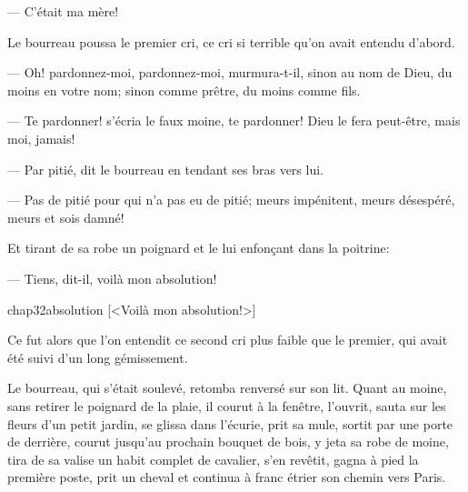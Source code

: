 — C'était ma mère!

Le bourreau poussa le premier cri, ce cri si terrible qu'on avait entendu d'abord.

— Oh! pardonnez-moi, pardonnez-moi, murmura-t-il, sinon au nom de Dieu, du moins en votre nom; sinon comme prêtre, du moins comme fils.

— Te pardonner! s'écria le faux moine, te pardonner! Dieu le fera peut-être, mais moi, jamais!

— Par pitié, dit le bourreau en tendant ses bras vers lui.

— Pas de pitié pour qui n'a pas eu de pitié; meurs impénitent, meurs désespéré, meurs et sois damné!

Et tirant de sa robe un poignard et le lui enfonçant dans la poitrine:

— Tiens, dit-il, voilà mon absolution!

\begin{bwbigpic}
	[\basicscale] 
	{chap32absolution}
	[<Voilà mon absolution!>]
\end{bwbigpic}

Ce fut alors que l'on entendit ce second cri plus faible que le premier, qui avait été suivi d'un long gémissement.

Le bourreau, qui s'était soulevé, retomba renversé sur son lit. Quant au moine, sans retirer le poignard de la plaie, il courut à la fenêtre, l'ouvrit, sauta sur les fleurs d'un petit jardin, se glissa dans l'écurie, prit sa mule, sortit par une porte de derrière, courut jusqu'au prochain bouquet de bois, y jeta sa robe de moine, tira de sa valise un habit complet de cavalier, s'en revêtit, gagna à pied la première poste, prit un cheval et continua à franc étrier son chemin vers Paris.